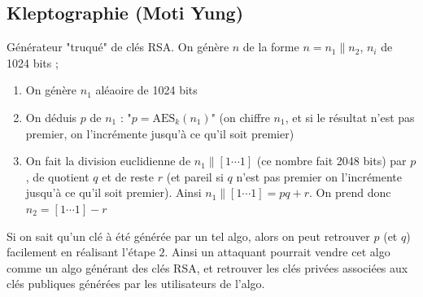         \subsection{Kleptographie (Moti Yung)}
            \begin{expl}
                Générateur "truqué" de clés RSA. On génère $n$ de la forme $n = n_1 \| n_2$, $n_i$ de 1024 bits ;
                \begin{enumerate}
                    \item On génère $n_1$ aléaoire de 1024 bits
                    \item On déduis $p$ de $n_1$ : "$p = \mathrm{AES}_k(n_1)$" (on chiffre $n_1$, et si le résultat n'est pas premier, on l'incrémente jusqu'à ce qu'il soit premier)
                    \item On fait la division euclidienne de $n_1 \| [1 \cdots 1]$ (ce nombre fait 2048 bits) par $p$, de quotient $q$ et de reste $r$ (et pareil si $q$ n'est pas premier on l'incrémente jusqu'à ce qu'il soit premier). Ainsi $n_1 \| [1 \cdots 1] = pq + r$. On prend donc $n_2 = [1 \cdots 1] - r$
                \end{enumerate}
                Si on sait qu'un clé à été générée par un tel algo, alors on peut retrouver $p$ (et $q$) facilement en réalisant l'étape $2$. Ainsi un attaquant pourrait vendre cet algo comme un algo générant des clés RSA, et retrouver les clés privées associées aux clés publiques générées par les utilisateurs de l'algo.
            \end{expl}
            